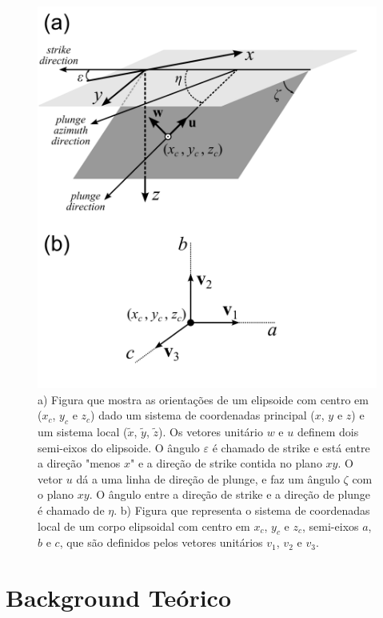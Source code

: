 \begin{figure}[hbt!]
	\centering \includegraphics[width=12 cm,height=14.5 cm]{figures/structural_orientation_angles}
	\caption[Figura que mostra as orientações de um elipsoide dado um sistema de coordenadas principal ($x$, $y$e $z$) e um sistema local ($\tilde{x}$, $\tilde{y}$, $\tilde{z}$.)]{a) Figura que mostra as orientações de um elipsoide com centro em ($x_c$, $y_c$ e $z_c$) dado um sistema de coordenadas principal ($x$, $y$ e $z$) e um sistema local ($\tilde{x}$, $\tilde{y}$, $\tilde{z}$). Os vetores unitário $w$ e $u$ definem dois semi-eixos do elipsoide. O ângulo $\varepsilon$ é chamado de strike e está entre a direção "menos $x$" e a direção de strike contida no plano $xy$. O vetor $u$ dá a uma linha de direção de plunge, e faz um ângulo $\zeta$ com o plano $xy$. O ângulo entre a direção de strike e a direção de plunge é chamado de $\eta$. b) Figura que representa o sistema de coordenadas local de um corpo elipsoidal com centro em $x_c$, $y_c$ e $z_c$, semi-eixos $a$, $b$ e $c$, que são definidos pelos vetores unitários $v_1$, $v_2$ e $v_3$.}
	\label{fig:structural_orientation_angles}
\end{figure}

\section{Background Teórico}


